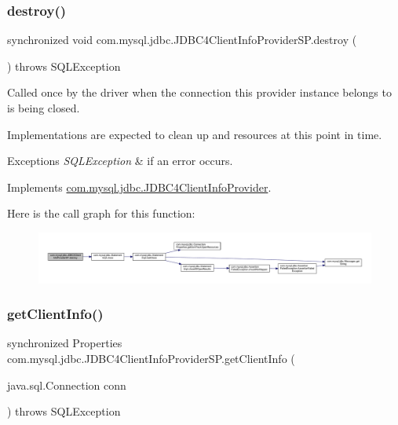 \subsubsection{\texorpdfstring{destroy()}{destroy()}}
{\footnotesize\ttfamily synchronized void com.\+mysql.\+jdbc.\+J\+D\+B\+C4\+Client\+Info\+Provider\+S\+P.\+destroy (\begin{DoxyParamCaption}{ }\end{DoxyParamCaption}) throws S\+Q\+L\+Exception}

Called once by the driver when the connection this provider instance belongs to is being closed.

Implementations are expected to clean up and resources at this point in time.


\begin{DoxyExceptions}{Exceptions}
{\em S\+Q\+L\+Exception} & if an error occurs. \\
\hline
\end{DoxyExceptions}


Implements \mbox{\hyperlink{interfacecom_1_1mysql_1_1jdbc_1_1_j_d_b_c4_client_info_provider_affe0c92bcc9885faf204401f221fed76}{com.\+mysql.\+jdbc.\+J\+D\+B\+C4\+Client\+Info\+Provider}}.

Here is the call graph for this function\+:
\nopagebreak
\begin{figure}[H]
\begin{center}
\leavevmode
\includegraphics[width=350pt]{classcom_1_1mysql_1_1jdbc_1_1_j_d_b_c4_client_info_provider_s_p_a0115e7120ff51f36e85b8d4bfb10c3f7_cgraph}
\end{center}
\end{figure}
\mbox{\label{classcom_1_1mysql_1_1jdbc_1_1_j_d_b_c4_client_info_provider_s_p_a75c1a50050648fcab79401cd73342756}} 
\subsubsection{\texorpdfstring{get\+Client\+Info()}{getClientInfo()}\hspace{0.1cm}{\footnotesize\ttfamily [1/2]}}
{\footnotesize\ttfamily synchronized Properties com.\+mysql.\+jdbc.\+J\+D\+B\+C4\+Client\+Info\+Provider\+S\+P.\+get\+Client\+Info (\begin{DoxyParamCaption}\item[{java.\+sql.\+Connection}]{conn }\end{DoxyParamCaption}) throws S\+Q\+L\+Exception}


